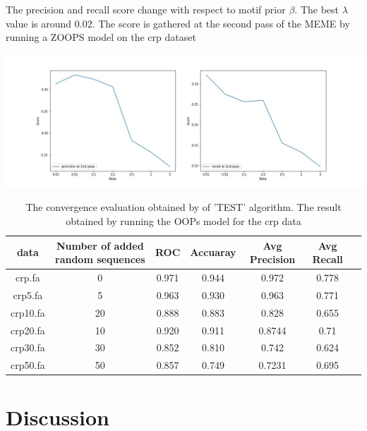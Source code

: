 \documentclass{article}
\begin{document}
\begin{table}[ht]
\centering
 \caption{The precision and recall score change with respect to motif prior $\beta$. The best $\lambda$ value is around 0.02. The score is gathered at the second pass of the MEME by running a ZOOPS model on the crp dataset}
\includegraphics[scale=0.3]{lambda.jpg}
\label{fig:lambda}
\end{table}



\begin{table}
\caption{The convergence evaluation obtained by  of 'TEST' algorithm. The result obtained by running the OOPs model for the crp data}
\centering
  \begin{tabular}{|c|c|c|c|c|c|c|}
    \textbf{ data}     & \textbf{Number of added random sequences}&\textbf{ROC}&\textbf{Accuaray} &\textbf{Avg Precision}&\textbf{Avg Recall}\\
  \midrule
crp.fa & 0  &0.971     & 0.944   &    0.972    &   0.778 \\

crp5.fa & 5 & 0.963  &0.930 &  0.963 &0.771 \\


crp10.fa & 20 & 0.888  &0.883 & 0.828 &0.655 \\

crp20.fa & 10 & 0.920  &0.911 & 0.8744 &0.71 \\

crp30.fa & 30 & 0.852  &0.810 & 0.742 &0.624 \\

crp50.fa & 50 & 0.857  &0.749 & 0.7231 &0.695 \\

\hline
   
\end{tabular}
\end{table}
     


\section{Discussion}
\end{document}
